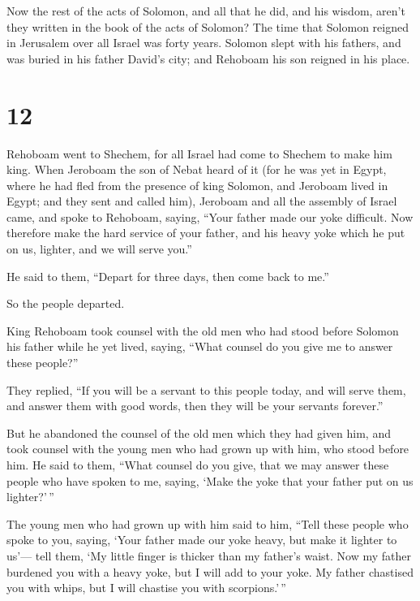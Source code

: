 Now the rest of the acts of Solomon, and all that he
did, and his wisdom, aren't they written in the book of the acts of
Solomon?  The time that Solomon reigned in Jerusalem over
all Israel was forty years.  Solomon slept with his
fathers, and was buried in his father David's city; and Rehoboam his son
reigned in his place.

\hypertarget{section-11}{%
\section{12}\label{section-11}}

 Rehoboam went to Shechem, for all Israel had come to
Shechem to make him king.  When Jeroboam the son of Nebat
heard of it (for he was yet in Egypt, where he had fled from the
presence of king Solomon, and Jeroboam lived in Egypt; 
and they sent and called him), Jeroboam and all the assembly of Israel
came, and spoke to Rehoboam, saying,  ``Your father made
our yoke difficult. Now therefore make the hard service of your father,
and his heavy yoke which he put on us, lighter, and we will serve you.''

 He said to them, ``Depart for three days, then come back
to me.''

So the people departed.

 King Rehoboam took counsel with the old men who had stood
before Solomon his father while he yet lived, saying, ``What counsel do
you give me to answer these people?''

 They replied, ``If you will be a servant to this people
today, and will serve them, and answer them with good words, then they
will be your servants forever.''

 But he abandoned the counsel of the old men which they
had given him, and took counsel with the young men who had grown up with
him, who stood before him.  He said to them, ``What
counsel do you give, that we may answer these people who have spoken to
me, saying, `Make the yoke that your father put on us lighter?'\,''

 The young men who had grown up with him said to him,
``Tell these people who spoke to you, saying, `Your father made our yoke
heavy, but make it lighter to us'--- tell them, `My little finger is
thicker than my father's waist.  Now my father burdened
you with a heavy yoke, but I will add to your yoke. My father chastised
you with whips, but I will chastise you with scorpions.'\,''

